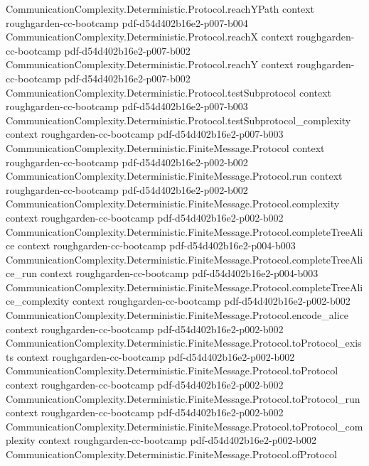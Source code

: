 \begin{theorem}
\proofstep
  {CommunicationComplexity.Deterministic.Protocol.reachYPath}
  {context}
  {roughgarden-cc-bootcamp}
  {pdf-d54d402b16e2-p007-b004}
\proofstep
  {CommunicationComplexity.Deterministic.Protocol.reachX}
  {context}
  {roughgarden-cc-bootcamp}
  {pdf-d54d402b16e2-p007-b002}
\proofstep
  {CommunicationComplexity.Deterministic.Protocol.reachY}
  {context}
  {roughgarden-cc-bootcamp}
  {pdf-d54d402b16e2-p007-b002}
\proofstep
  {CommunicationComplexity.Deterministic.Protocol.testSubprotocol}
  {context}
  {roughgarden-cc-bootcamp}
  {pdf-d54d402b16e2-p007-b003}
\proofstep
  {CommunicationComplexity.Deterministic.Protocol.testSubprotocol_complexity}
  {context}
  {roughgarden-cc-bootcamp}
  {pdf-d54d402b16e2-p007-b003}
\proofstep
  {CommunicationComplexity.Deterministic.FiniteMessage.Protocol}
  {context}
  {roughgarden-cc-bootcamp}
  {pdf-d54d402b16e2-p002-b002}
\proofstep
  {CommunicationComplexity.Deterministic.FiniteMessage.Protocol.run}
  {context}
  {roughgarden-cc-bootcamp}
  {pdf-d54d402b16e2-p002-b002}
\proofstep
  {CommunicationComplexity.Deterministic.FiniteMessage.Protocol.complexity}
  {context}
  {roughgarden-cc-bootcamp}
  {pdf-d54d402b16e2-p002-b002}
\proofstep
  {CommunicationComplexity.Deterministic.FiniteMessage.Protocol.completeTreeAlice}
  {context}
  {roughgarden-cc-bootcamp}
  {pdf-d54d402b16e2-p004-b003}
\proofstep
  {CommunicationComplexity.Deterministic.FiniteMessage.Protocol.completeTreeAlice_run}
  {context}
  {roughgarden-cc-bootcamp}
  {pdf-d54d402b16e2-p004-b003}
\proofstep
  {CommunicationComplexity.Deterministic.FiniteMessage.Protocol.completeTreeAlice_complexity}
  {context}
  {roughgarden-cc-bootcamp}
  {pdf-d54d402b16e2-p002-b002}
\proofstep
  {CommunicationComplexity.Deterministic.FiniteMessage.Protocol.encode_alice}
  {context}
  {roughgarden-cc-bootcamp}
  {pdf-d54d402b16e2-p002-b002}
\proofstep
  {CommunicationComplexity.Deterministic.FiniteMessage.Protocol.toProtocol_exists}
  {context}
  {roughgarden-cc-bootcamp}
  {pdf-d54d402b16e2-p002-b002}
\proofstep
  {CommunicationComplexity.Deterministic.FiniteMessage.Protocol.toProtocol}
  {context}
  {roughgarden-cc-bootcamp}
  {pdf-d54d402b16e2-p002-b002}
\proofstep
  {CommunicationComplexity.Deterministic.FiniteMessage.Protocol.toProtocol_run}
  {context}
  {roughgarden-cc-bootcamp}
  {pdf-d54d402b16e2-p002-b002}
\proofstep
  {CommunicationComplexity.Deterministic.FiniteMessage.Protocol.toProtocol_complexity}
  {context}
  {roughgarden-cc-bootcamp}
  {pdf-d54d402b16e2-p002-b002}
\proofstep
  {CommunicationComplexity.Deterministic.FiniteMessage.Protocol.ofProtocol}

\end{theorem}
